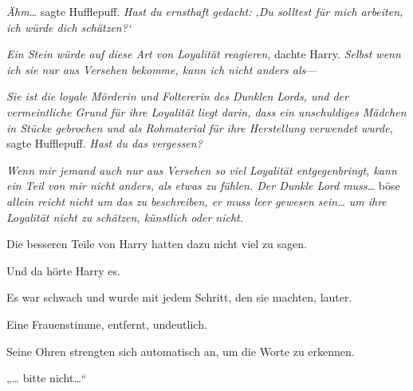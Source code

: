 \emph{Ähm}… sagte Hufflepuff. \emph{Hast du ernsthaft gedacht: ‚Du solltest für mich arbeiten, ich würde dich schätzen?`}

\emph{Ein Stein würde auf diese Art von Loyalität reagieren}, dachte Harry. \emph{Selbst wenn ich sie nur aus Versehen bekomme, kann ich nicht anders als}—

\emph{Sie ist die loyale Mörderin und Foltererin des Dunklen Lords, und der vermeintliche Grund für ihre Loyalität liegt darin, dass ein unschuldiges Mädchen in Stücke gebrochen und als Rohmaterial für ihre Herstellung verwendet wurde}, sagte Hufflepuff. \emph{Hast du das vergessen?}

\emph{Wenn mir jemand auch nur aus Versehen so viel Loyalität entgegenbringt, kann ein Teil von mir nicht anders, als etwas zu fühlen. Der Dunkle Lord muss…} böse \emph{allein reicht nicht um das zu beschreiben, er muss leer gewesen sein… um ihre Loyalität nicht zu schätzen, künstlich oder nicht.}

Die besseren Teile von Harry hatten dazu nicht viel zu sagen.

Und da hörte Harry es.

Es war schwach und wurde mit jedem Schritt, den sie machten, lauter.

Eine Frauenstimme, entfernt, undeutlich.

Seine Ohren strengten sich automatisch an, um die Worte zu erkennen.

„… bitte nicht…“

